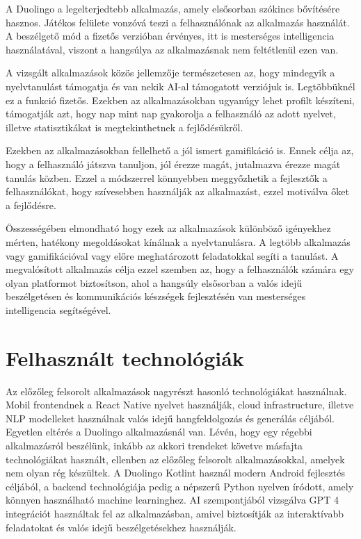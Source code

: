 A Duolingo a legelterjedtebb alkalmazás, amely elsősorban szókincs bővítésére hasznos.\cite{duolingoMax} Játékos felülete vonzóvá teszi a felhasználónak az alkalmazás használát. A beszélgető mód a fizetős verzióban érvényes, itt is mesterséges intelligencia használatával, viszont a hangsúlya az alkalmazásnak nem feltétlenül ezen van.

A vizsgált alkalmazások közös jellemzője természetesen az, hogy mindegyik a nyelvtanulást támogatja és van nekik AI-al támogatott verziójuk is. Legtöbbüknél ez a funkció fizetős. Ezekben az alkalmazásokban ugyanúgy lehet profilt készíteni, támogatják azt, hogy nap mint nap gyakorolja a felhasználó az adott nyelvet, illetve statisztikákat is megtekinthetnek a fejlődésükről.

Ezekben az alkalmazásokban fellelhető a jól ismert gamifikáció is. Ennek célja az, hogy a felhasználó játszva tanuljon, jól érezze magát, jutalmazva érezze magát tanulás közben. \cite{deterding2011gamification} Ezzel a módszerrel könnyebben meggyőzhetik a fejlesztők a felhasználókat, hogy szívesebben használják az alkalmazást, ezzel motiválva őket a fejlődésre.

Összességében elmondható hogy ezek az alkalmazások különböző igényekhez mérten, hatékony megoldásokat kínálnak a nyelvtanulásra. A legtöbb alkalmazás vagy gamifikációval vagy előre meghatározott feladatokkal segíti a tanulást. A megvalósított alkalmazás célja ezzel szemben az, hogy a felhasználók számára egy olyan platformot biztosítson, ahol a hangsúly elsősorban a valós idejű beszélgetésen és kommunikációs készségek fejlesztésén van mesterséges intelligencia segítségével.

\section{Felhasznált technológiák}

Az előzőleg felsorolt alkalmazások nagyrészt hasonló technológiákat használnak. Mobil frontendnek a React Native nyelvet használják, cloud infrastructure, illetve NLP modelleket használnak valós idejű hangfeldolgozás és generálás céljából. Egyetlen eltérés a Duolingo alkalmazásnál van. Lévén, hogy egy régebbi alkalmazásról beszélünk, inkább az akkori trendeket követve másfajta technológiákat használt, ellenben az előzőleg felsorolt alkalmazásokkal, amelyek nem olyan rég készültek. A Duolingo Kotlint használ modern Android fejlesztés céljából, a backend technológiája pedig a népszerű Python nyelven íródott, amely könnyen használható machine learninghez. AI szempontjából vizsgálva GPT 4 integrációt használtak fel az alkalmazásban, amivel biztosítják az interaktívabb feladatokat és valós idejű beszélgetésekhez használják.

